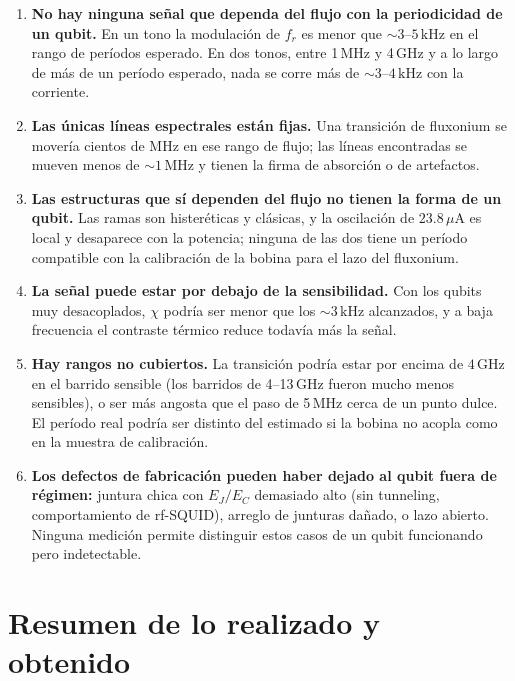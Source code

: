 \documentclass[11pt,a4paper]{article}
\newcommand{\uA}{\,\mu\mathrm{A}}
\newcommand{\GHz}{\,\mathrm{GHz}}
\newcommand{\MHz}{\,\mathrm{MHz}}
\newcommand{\kHz}{\,\mathrm{kHz}}
\newcommand{\fr}{f_r}
\begin{document}
\begin{enumerate}
  \item \textbf{No hay ninguna señal que dependa del flujo con la periodicidad de un qubit.} En un tono la modulación
    de $\fr$ es menor que $\sim 3$--$5\kHz$ en el rango de períodos esperado. En dos tonos, entre 1\,MHz y 4\,GHz y
    a lo largo de más de un período esperado, nada se corre más de $\sim 3$--$4\kHz$ con la corriente.
  \item \textbf{Las únicas líneas espectrales están fijas.} Una transición de fluxonium se movería cientos de MHz en
    ese rango de flujo; las líneas encontradas se mueven menos de $\sim 1\MHz$ y tienen la firma de absorción o de
    artefactos.
  \item \textbf{Las estructuras que sí dependen del flujo no tienen la forma de un qubit.} Las ramas son
    histeréticas y clásicas, y la oscilación de $23.8\uA$ es local y desaparece con la potencia; ninguna de las dos
    tiene un período compatible con la calibración de la bobina para el lazo del fluxonium.
  \item \textbf{La señal puede estar por debajo de la sensibilidad.} Con los qubits muy desacoplados, $\chi$ podría
    ser menor que los $\sim 3\kHz$ alcanzados, y a baja frecuencia el contraste térmico reduce todavía más la señal.
  \item \textbf{Hay rangos no cubiertos.} La transición podría estar por encima de $4\GHz$ en el barrido sensible
    (los barridos de 4--13\,GHz fueron mucho menos sensibles), o ser más angosta que el paso de 5\,MHz cerca de un
    punto dulce. El período real podría ser distinto del estimado si la bobina no acopla como en la muestra de
    calibración.
  \item \textbf{Los defectos de fabricación pueden haber dejado al qubit fuera de régimen:} juntura chica con
    $E_J/E_C$ demasiado alto (sin tunneling, comportamiento de rf-SQUID), arreglo de junturas dañado, o lazo abierto.
    Ninguna medición permite distinguir estos casos de un qubit funcionando pero indetectable.
\end{enumerate}

\section{Resumen de lo realizado y obtenido}
\end{document}
